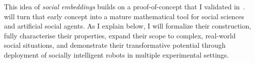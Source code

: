 This idea of \emph{social embeddings} builds on a proof-of-concept that I
validated in~\cite{lemaignan2024social}. \project will turn that early concept
into a mature mathematical tool for social sciences and artificial social
agents. As I explain below, I will formalize their construction,  fully
characterise their properties, expand their scope to complex, real-world social
situations, and demonstrate their transformative potential through deployment of
socially intelligent robots in multiple experimental settings.

%
%



%
%

